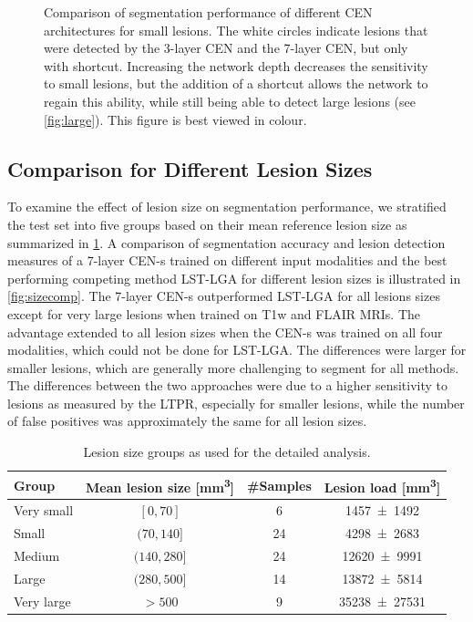 \begin{figure}[p]
\caption[Comparison of segmentation performance of different CEN architectures
for small lesions]{Comparison of segmentation performance of different CEN architectures
for small lesions. The white circles indicate lesions that were detected by the
3-layer CEN and the 7-layer CEN, but only with shortcut. Increasing the network
depth decreases the sensitivity to small lesions, but the addition of a
shortcut allows the network to regain this ability, while still being able to
detect large lesions (see \ref{fig:large}). This figure is best viewed in
colour.}
\label{fig:small}
\end{figure}

\subsection[Comparison for different lesion sizes]{Comparison for Different
Lesion Sizes}

To examine the effect of lesion size on segmentation performance, we stratified
the test set into five groups based on their mean reference lesion size as
summarized in \ref{tab:groups}. A comparison of segmentation accuracy and lesion
detection measures of a 7-layer CEN-s trained on different input modalities and
the best performing competing method LST-LGA for different lesion sizes is
illustrated in \ref{fig:sizecomp}. The 7-layer CEN-s outperformed LST-LGA for
all lesions sizes except for very large lesions when trained on T1w and FLAIR
MRIs. The advantage extended to all lesion sizes when the \mbox{CEN-s} was
trained on all four modalities, which could not be done for LST-LGA.
The differences were larger for smaller lesions, which are generally more
challenging to segment for all methods. The differences between the two
approaches were due to a higher sensitivity to lesions as measured by the LTPR,
especially for smaller lesions, while the number of false positives was
approximately the same for all lesion sizes.

\begin{table}[tb]
\caption{Lesion size groups as used for the detailed analysis.}
\label{tab:groups}
\centering
\begin{tabular}{lccc}
\toprule
Group & Mean lesion size [\si{\cubic\milli\metre}] & \#Samples & Lesion
load [\si{\cubic\milli\metre}] \\
\midrule
Very small & $[0,70]$ & 6 & \num{1457+-1492} \\
Small      & $(70,140]$ & 24 & \num{4298+-2683} \\
Medium & $(140,280]$ & 24 & \num{12620+-9991} \\
Large & $(280,500]$ & 14 & \num{13872+-5814} \\
Very large & $> 500$ & 9 & \num{35238+-27531} \\
\bottomrule
\end{tabular}
\end{table}

